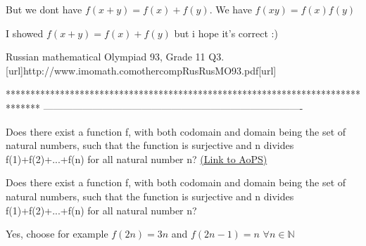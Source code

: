 \begin{solution}
	\begin{tcolorbox}
But we dont have $f(x+y)=f(x)+f(y)$. We have $f(xy)=f(x)f(y)$ 
\end{tcolorbox}


I showed $f(x+y)=f(x)+f(y)$ but i hope it's correct :)
\end{solution}



\begin{solution}
	Russian mathematical Olympiad 93, Grade 11 Q3.
[url]http://www.imomath.com\/othercomp\/Rus\/RusMO93.pdf[\/url]
\end{solution}
*******************************************************************************
-------------------------------------------------------------------------------

\begin{problem}
	Does there exist a function f, with both codomain and domain being the set of natural numbers, such that the function  is surjective and n divides f(1)+f(2)+...+f(n) for all natural number n?
	\flushright \href{https://artofproblemsolving.com/community/c6h480330}{(Link to AoPS)}
\end{problem}



\begin{solution}
	\begin{tcolorbox}Does there exist a function f, with both codomain and domain being the set of natural numbers, such that the function  is surjective and n divides f(1)+f(2)+...+f(n) for all natural number n?\end{tcolorbox}
Yes, choose for example $f(2n)=3n$ and $f(2n-1)=n$ $\forall n\in\mathbb N$
\end{solution}



